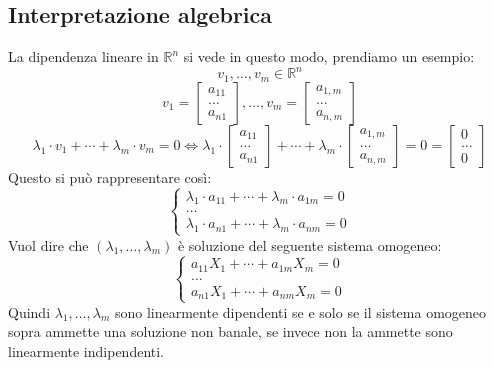 \documentclass[12pt,a4paper]{article}
\begin{document}
\subsection{Interpretazione algebrica}
La dipendenza lineare in $\mathbb{R}^n$ si vede in questo modo, prendiamo un esempio:
\[
v_1, \ldots, v_m \in \mathbb{R}^n
\]
\[
v_1 = \begin{bmatrix}
  a_{11}\\
  \ldots\\
  a_{n1}
\end{bmatrix}, \ldots, v_m = \begin{bmatrix}
  a_{1,m}\\
  \ldots\\
  a_{n,m}
\end{bmatrix}
\]
\[
\lambda_1 \cdot v_1 + \cdots + \lambda_m \cdot v_m = 0 \Leftrightarrow \lambda_1 \cdot \begin{bmatrix}
  a_{11}\\
  \ldots\\
  a_{n1}
\end{bmatrix} + \cdots + \lambda_m \cdot \begin{bmatrix}
  a_{1,m}\\
  \ldots\\
  a_{n,m}
\end{bmatrix} = 0 = \begin{bmatrix}
  0\\
  \ldots\\
  0
\end{bmatrix}
\]
Questo si può rappresentare così:
\[
\begin{cases}
  \lambda_1 \cdot a_{11} + \cdots + \lambda_m \cdot a_{1m} = 0\\
  \ldots\\
    \lambda_1 \cdot a_{n1} + \cdots + \lambda_m \cdot a_{nm} = 0
\end{cases}
\]
Vuol dire che $(\lambda_1,\ldots,\lambda_m)$ è soluzione del seguente sistema omogeneo:
\[
\begin{cases}
  a_{11}X_1 + \cdots + a_{1m}X_m = 0\\
  \ldots\\
  a_{n1}X_1 + \cdots + a_{nm}X_m = 0
\end{cases}
\]
Quindi $\lambda_1,\ldots,\lambda_m$ sono linearmente dipendenti se e solo se il sistema omogeneo sopra ammette una soluzione non banale, se invece non la ammette sono linearmente indipendenti.\\
\end{document}
